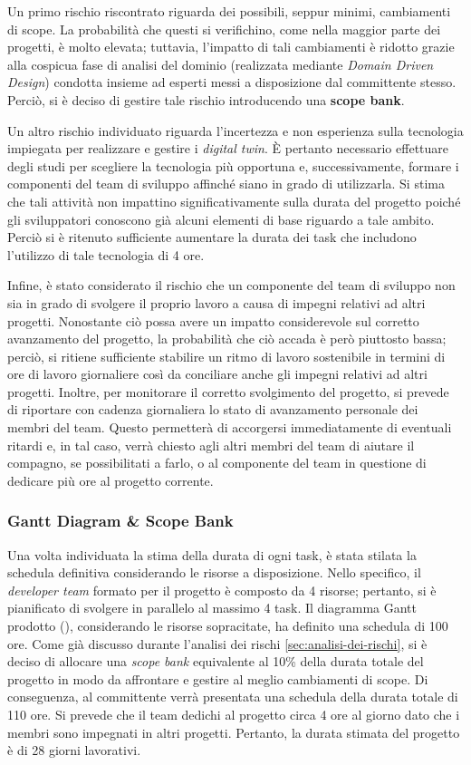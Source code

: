 Un primo rischio riscontrato riguarda dei possibili, seppur minimi, cambiamenti di scope.
La probabilità che questi si verifichino, come nella maggior parte dei progetti, è molto elevata; tuttavia, l'impatto di tali cambiamenti è ridotto grazie alla cospicua fase di analisi del dominio (realizzata mediante \textit{Domain Driven Design}) condotta insieme ad esperti messi a disposizione dal committente stesso.
Perciò, si è deciso di gestire tale rischio introducendo una \textbf{scope bank}.

Un altro rischio individuato riguarda l'incertezza e non esperienza sulla tecnologia impiegata per realizzare e gestire i \textit{digital twin}.
È pertanto necessario effettuare degli studi per scegliere la tecnologia più opportuna e, successivamente, formare i componenti del team di sviluppo affinché siano in grado di utilizzarla.
Si stima che tali attività non impattino significativamente sulla durata del progetto poiché gli sviluppatori conoscono già alcuni elementi di base riguardo a tale ambito.
Perciò si è ritenuto sufficiente aumentare la durata dei task che includono l'utilizzo di tale tecnologia di 4 ore.

Infine, è stato considerato il rischio che un componente del team di sviluppo non sia in grado di svolgere il proprio lavoro a causa di impegni relativi ad altri progetti.
Nonostante ciò possa avere un impatto considerevole sul corretto avanzamento del progetto, la probabilità che ciò accada è però piuttosto bassa; perciò, si ritiene sufficiente stabilire un ritmo di lavoro sostenibile in termini di ore di lavoro giornaliere così da conciliare anche gli impegni relativi ad altri progetti.
Inoltre, per monitorare il corretto svolgimento del progetto, si prevede di riportare con cadenza giornaliera lo stato di avanzamento personale dei membri del team.
Questo permetterà di accorgersi immediatamente di eventuali ritardi e, in tal caso, verrà chiesto agli altri membri del team di aiutare il compagno, se possibilitati a farlo, o al componente del team in questione di dedicare più ore al progetto corrente.

\subsubsection{Gantt Diagram \& Scope Bank}
Una volta individuata la stima della durata di ogni task, è stata stilata la schedula definitiva considerando le risorse a disposizione.
Nello specifico, il \textit{developer team} formato per il progetto è composto da 4 risorse; pertanto, si è pianificato di svolgere in parallelo al massimo 4 task.
Il diagramma Gantt prodotto (), considerando le risorse sopracitate, ha definito una schedula di 100 ore.
Come già discusso durante l'analisi dei rischi \ref{sec:analisi-dei-rischi}, si è deciso di allocare una \textit{scope bank} equivalente al 10\% della durata totale del progetto in modo da affrontare e gestire al meglio cambiamenti di scope.
Di conseguenza, al committente verrà presentata una schedula della durata totale di 110 ore.
Si prevede che il team dedichi al progetto circa 4 ore al giorno dato che i membri sono impegnati in altri progetti.
Pertanto, la durata stimata del progetto è di 28 giorni lavorativi.
